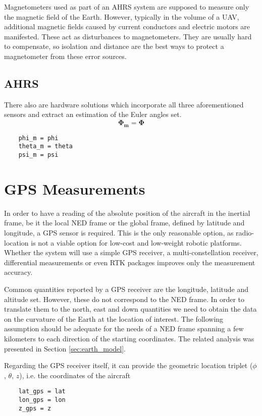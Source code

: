 Magnetometers used as part of an AHRS system are supposed to measure only the magnetic field of the Earth. However, typically in the volume of a UAV, additional magnetic fields caused by current conductors and electric motors are manifested. These act as disturbances to magnetometers. They are usually hard to compensate, so isolation and distance are the best ways to protect a magnetometer from these error sources.

\subsection{AHRS}
There also are hardware solutions which incorporate all three aforementioned sensors and extract an estimation of the Euler angles set.
\begin{equation}
	\bm{\Phi_{m}} = \bm{\Phi}
\end{equation}
%
\begin{lstlisting}
	phi_m = phi
	theta_m = theta
	psi_m = psi
\end{lstlisting}

\section{GPS Measurements}
In order to have a reading of the absolute position of the aircraft in the inertial frame, be it the local NED frame or the global frame, defined by latitude and longitude, a GPS sensor is required. This is the only reasonable option, as radio-location is not a viable option for low-cost and low-weight robotic platforms. Whether the system will use a simple GPS receiver, a multi-constellation receiver, differential measurements or even RTK packages improves only the measurement accuracy.

Common quantities reported by a GPS receiver are the longitude, latitude and altitude set. However, these do not correspond to the NED frame. In order to translate them to the north, east and down quantities we need to obtain the data on the curvature of the Earth at the location of interest. The following assumption should be adequate for the needs of a NED frame spanning a few kilometers to each direction of the starting coordinates. The related analysis was presented in Section \ref{sec:earth_model}.

Regarding the GPS receiver itself, it can provide the geometric location triplet ($\phi$, $\theta$, $z$), i.e. the coordinates of the aircraft
%
\begin{lstlisting}
	lat_gps = lat
	lon_gps = lon
	z_gps = z
\end{lstlisting}

